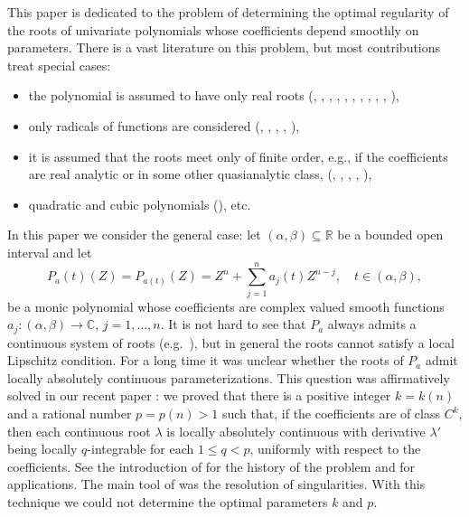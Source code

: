 \documentclass[12pt]{amsart}
\theoremstyle{plain}
\theoremstyle{definition}
\numberwithin{equation}{section}
\begin{document}
This paper is dedicated to the problem of determining the optimal regularity of the roots of 
univariate polynomials whose coefficients depend smoothly on parameters. There is a vast literature on this 
problem, but most contributions treat special cases: 
\begin{itemize}
    \item the polynomial is assumed to have only real roots 
    (\cite{Bronshtein79}, \cite{Mandai85}, \cite{Wakabayashi86}, \cite{AKLM98}, \cite{KLM04}, 
    \cite{BBCP06}, \cite{BonyColombiniPernazza06}, \cite{Tarama06}, \cite{BonyColombiniPernazza10}, \cite{ColombiniOrruPernazza12}, 
    \cite{ParusinskiRainerHyp}),
    \item only radicals of functions are considered (\cite{Glaeser63R}, \cite{CJS83}, \cite{Tarama00}, \cite{CL03}, \cite{GhisiGobbino13}),    
    \item it is assumed that the roots meet only of finite order, e.g., if the coefficients are real analytic or in some other quasianalytic class,
    (\cite{CC04}, \cite{RainerAC}, \cite{RainerQA}, \cite{RainerOmin}, \cite{RainerFin}),
    \item quadratic and cubic polynomials (\cite{Spagnolo99}), etc. 
\end{itemize}  
In this paper we consider the general case: let $({\alpha},{\beta}) \subseteq {\mathbb{R}}$ be a bounded open interval and let 
  \begin{equation} \label{curveofpolynomials}
    P_a(t)(Z)= P_{a(t)}(Z) = Z^n + \sum_{j=1}^n a_j(t) Z^{n-j}, \quad t \in ({\alpha},{\beta}), 
  \end{equation}
be a monic polynomial whose coefficients are complex valued smooth functions $a_j : ({\alpha},{\beta}) \to {\mathbb{C}}$, $j = 1,\ldots,n$. 
It is not hard to see that $P_a$ always admits a continuous system of roots (e.g.\ \cite[Ch.~II Theorem~5.2]{Kato76}), 
but in general the roots cannot satisfy a local Lipschitz condition. 
For a long time it was unclear whether the roots of $P_a$ admit locally absolutely continuous parameterizations. 
This question was 
affirmatively solved in our recent paper \cite{ParusinskiRainerAC}: we proved that there is a positive integer $k=k(n)$ and a 
rational number $p=p(n)>1$ such that, if the coefficients are of class $C^k$, then each continuous root ${\lambda}$ is locally absolutely continuous 
with derivative ${\lambda}'$ being locally $q$-integrable for each $1 \le q < p$, uniformly with respect to the coefficients. 
See the introduction of \cite{ParusinskiRainerAC} for the history of the problem and for applications. 
The main tool of \cite{ParusinskiRainerAC} was the resolution of singularities. With this technique we could not determine the 
optimal parameters $k$ and $p$.
\end{document}
